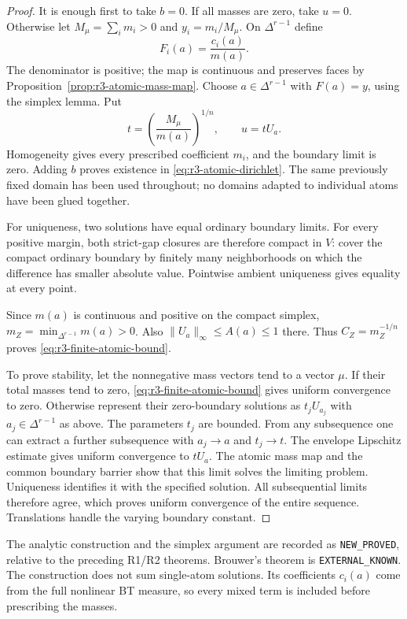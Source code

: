 \documentclass[11pt,a4paper]{article}
\numberwithin{equation}{section}
\theoremstyle{definition}
\theoremstyle{remark}
\begin{document}
\begin{proof}
It is enough first to take $b=0$. If all masses are zero,
take $u=0$. Otherwise let $M_\mu=\sum_i m_i>0$ and
$y_i=m_i/M_\mu$. On $\Delta^{r-1}$ define
\[
 F_i(a)=\frac{c_i(a)}{m(a)}.
\]
The denominator is positive; the map is continuous and
preserves faces by Proposition~\ref{prop:r3-atomic-mass-map}.
Choose $a\in\Delta^{r-1}$ with $F(a)=y$, using the
simplex lemma. Put
\[
 t=\left(\frac{M_\mu}{m(a)}\right)^{1/n},\qquad u=tU_a.
\]
Homogeneity gives every prescribed coefficient $m_i$, and
the boundary limit is zero. Adding $b$ proves existence in
\eqref{eq:r3-atomic-dirichlet}. The same previously fixed
domain has been used throughout; no domains adapted to
individual atoms have been glued together.

For uniqueness, two solutions have equal ordinary boundary
limits. For every positive margin, both strict-gap closures
are therefore compact in $V$: cover the compact ordinary
boundary by finitely many neighborhoods on which the
difference has smaller absolute value. Pointwise ambient
uniqueness gives equality at every point.

Since $m(a)$ is continuous and positive on the compact
simplex, $m_Z=\min_{\Delta^{r-1}}m(a)>0$. Also
$\|U_a\|_\infty\leq A(a)\leq1$ there. Thus
$C_Z=m_Z^{-1/n}$ proves \eqref{eq:r3-finite-atomic-bound}.

To prove stability, let the nonnegative mass vectors tend
to a vector $\mu$. If their total masses tend to zero,
\eqref{eq:r3-finite-atomic-bound} gives uniform convergence
to zero. Otherwise represent their zero-boundary solutions
as $t_jU_{a_j}$ with $a_j\in\Delta^{r-1}$ as above.
The parameters $t_j$ are bounded. From any subsequence one
can extract a further subsequence with $a_j\to a$ and
$t_j\to t$. The envelope Lipschitz estimate gives uniform
convergence to $tU_a$. The atomic mass map and the common
boundary barrier show that this limit solves the limiting
problem. Uniqueness identifies it with the specified
solution. All subsequential limits therefore agree, which
proves uniform convergence of the entire sequence.
Translations handle the varying boundary constant.
\end{proof}

The analytic construction and the simplex argument are recorded
as \texttt{NEW\_PROVED}, relative to the preceding R1/R2
theorems. Brouwer's theorem is \texttt{EXTERNAL\_KNOWN}.
The construction does not sum single-atom solutions. Its
coefficients $c_i(a)$ come from the full nonlinear BT measure,
so every mixed term is included before prescribing the masses.
\end{document}
